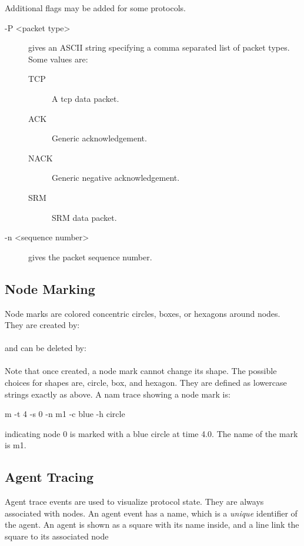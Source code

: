 Additional flags may be added for some protocols.
\begin{description}
\item[-P <packet type>] gives an ASCII string specifying a comma separated list of packet types.
     Some values  are:
     \begin{description}
       \item[TCP]  A  tcp  data  packet.
       \item[ACK]  Generic  acknowledgement.
       \item[NACK] Generic  negative acknowledgement.
       \item[SRM]  SRM data packet.
     \end{description}

\item[-n <sequence number>] gives the packet sequence number.
\end{description}


\subsection{Node Marking}

Node marks are colored concentric circles, boxes, or hexagons around nodes. 
They are created by:\\
\\
and can be deleted by:\\
\\
Note that once created, a node mark cannot change its shape. The possible
choices for shapes are, circle, box, and hexagon. They are defined as 
lowercase strings exactly as above. A nam trace showing a node mark is:
\begin{program}
m -t 4 -s 0 -n m1 -c blue -h circle
\end{program}
indicating node 0 is marked with a blue circle at time 4.0. The name of
the mark is m1.

\subsection{Agent Tracing}

Agent trace events are used to visualize protocol state.
They are always associated with nodes. 
An agent event has a name, which is a {\it unique} identifier of the
agent. 
An agent is shown as a square with its name inside, and a line link
the square to its associated node 

